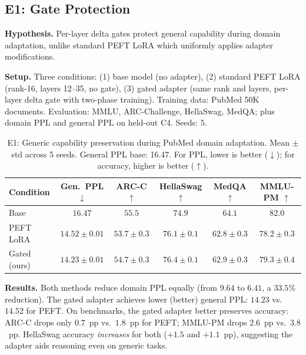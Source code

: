 \documentclass{article}
\begin{document}
\subsection{E1: Gate Protection}
\label{sec:e1}

\textbf{Hypothesis.} Per-layer delta gates protect general capability
during domain adaptation, unlike standard PEFT LoRA which uniformly
applies adapter modifications.

\textbf{Setup.} Three conditions: (1) base model (no adapter),
(2) standard PEFT LoRA (rank-16, layers 12--35, no gate),
(3) gated adapter (same rank and layers, per-layer delta gate with
two-phase training). Training data: PubMed 50K documents. Evaluation:
MMLU, ARC-Challenge, HellaSwag, MedQA; plus domain PPL and general PPL
on held-out C4. Seeds: 5.


\begin{table}[h]
\centering
\caption{E1: Generic capability preservation during PubMed domain
adaptation. Mean $\pm$ std across 5 seeds. General PPL base: 16.47.
For PPL, lower is better ($\downarrow$); for accuracy, higher is
better ($\uparrow$).}
\label{tab:e1}
\begin{tabular}{@{}lccccc@{}}
\toprule
Condition & Gen.\ PPL $\downarrow$ & ARC-C $\uparrow$ & HellaSwag $\uparrow$ & MedQA $\uparrow$ & MMLU-PM $\uparrow$ \\
\midrule
Base         & $16.47$   & $55.5$          & $74.9$          & $64.1$          & $82.0$ \\
PEFT LoRA    & $14.52{\pm}0.01$  & $53.7{\pm}0.3$  & $76.1{\pm}0.1$  & $62.8{\pm}0.3$  & $78.2{\pm}0.3$ \\
Gated (ours) & $\mathbf{14.23{\pm}0.01}$  & $\mathbf{54.7{\pm}0.3}$  & $\mathbf{76.4{\pm}0.1}$  & $62.9{\pm}0.3$  & $\mathbf{79.3{\pm}0.4}$ \\
\bottomrule
\end{tabular}
\end{table}

\textbf{Results.} Both methods reduce domain PPL equally (from $9.64$
to $6.41$, a $33.5\%$ reduction).  The gated adapter achieves lower
(better) general PPL: $14.23$ vs.\ $14.52$ for PEFT.  On benchmarks,
the gated adapter better preserves accuracy: ARC-C drops only
$0.7$~pp vs.\ $1.8$~pp for PEFT; MMLU-PM drops $2.6$~pp vs.\
$3.8$~pp.  HellaSwag accuracy \emph{increases} for both ($+1.5$ and
$+1.1$~pp), suggesting the adapter aids reasoning even on generic
tasks.
\end{document}
